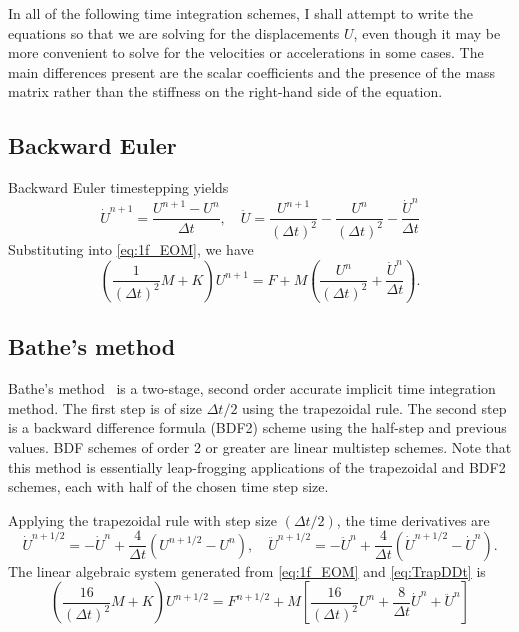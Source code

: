 \documentclass[12pt]{article}
\begin{document}
In all of the following time integration schemes,
I shall attempt to write the equations so that we are
solving for the displacements $U$, even though it
may be more convenient to solve for the velocities
or accelerations in some cases.  The main differences
present are the scalar coefficients and the presence
of the mass matrix rather than the stiffness on the 
right-hand side of the equation.


\subsection{Backward Euler}

Backward Euler timestepping yields
\begin{equation}
\label{eq:EulerDDt}
\dot{U}^{n+1} = \frac{U^{n+1} - U^n}{\Delta t}, 
\quad 
\ddot{U} = \frac{U^{n+1}}{(\Delta t)^2} - \frac{U^n}{(\Delta t)^2} - \frac{\dot{U}^n}{\Delta t}
\end{equation}
Substituting into \eqref{eq:1f_EOM}, we have
\begin{equation}
\left(\frac{1}{(\Delta t)^2} M + K \right) U^{n+1} = 
F + M \left( \frac{U^n}{(\Delta t)^2} + \frac{\dot{U}^n}{\Delta t} \right).
\end{equation}


\subsection{Bathe's method}

Bathe's method~\cite{Bathe2007} is a two-stage, second order accurate implicit time integration method.
The first step is of size $\Delta t/2$ using the trapezoidal rule.  The second step is a 
backward difference formula (BDF2) scheme using the half-step and previous values.  BDF
schemes of order 2 or greater are linear multistep schemes.  Note that this method is essentially leap-frogging
applications of the trapezoidal and BDF2 schemes, each with half of the chosen time step size.

Applying the trapezoidal rule with step size $(\Delta t/2)$, the time derivatives are
\begin{equation}
\label{eq:TrapDDt}
\dot{U}^{n+1/2} = -\dot{U}^n + \frac{4}{\Delta t} \left( U^{n+1/2}-U^n\right),
\quad
\ddot{U}^{n+1/2} = -\ddot{U}^n + \frac{4}{\Delta t} \left( \dot{U}^{n+1/2}-\dot{U}^n\right).
\end{equation}
The linear algebraic system generated from \eqref{eq:1f_EOM} and \eqref{eq:TrapDDt}
is 
\begin{equation}
\left(\frac{16}{(\Delta t)^2} M + K \right) U^{n+1/2} = F^{n+1/2}
+ M\left[ \frac{16}{(\Delta t)^2} U^n + \frac{8}{\Delta t} \dot{U}^n + \ddot{U}^n\right]
\end{equation}
\end{document}
